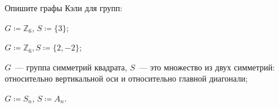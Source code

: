 Опишите графы Кэли для групп:
\begin{enumcyr}
    \item $G \coloneqq \mathbb{Z}_6$, $S \coloneqq \{3\}$;
    \item $G \coloneqq \mathbb{Z}_6, S \coloneqq \{2, -2\}$;
    \item $G$~--- группа симметрий квадрата, $S$~--- это множество из двух симметрий: относительно
        вертикальной оси и относительно главной диагонали;
    \item $G \coloneqq S_n$, $S \coloneqq A_n$.
\end{enumcyr}